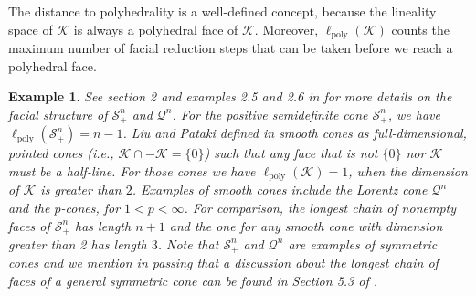 \documentclass{article}
\newcommand{\SOC}[1]{{\mathcal{Q}^{#1}}}
\newcommand{\PSDcone}[1]{{\mathcal{S}^{#1}_+}}
\newcommand{\stdCone}{ {\mathcal{K}}}
\newcommand{\distP}{\ell _{\text{poly}}}
\newtheorem{example}{Example}
\begin{document}
The distance to polyhedrality is a well-defined concept, because the lineality space
of $\stdCone$ is always a polyhedral face of $\stdCone$.
Moreover, $\distP(\stdCone)$ counts the maximum number of facial reduction steps that 
can be taken before we reach a polyhedral face.
\begin{example}\label{ex:psd_lorentz}
	See section 2 and examples 2.5 and 2.6 in \cite{pataki_handbook} for more details 
	on the facial structure of $\PSDcone{n}$ and $\SOC{n}$.
	For the positive semidefinite cone $\PSDcone{n}$, we have $\distP(\PSDcone{n}) = n-1$.
	Liu and Pataki defined in \cite{LP17} \emph{smooth cones} as 
	full-dimensional, pointed cones (i.e., $\stdCone \cap -\stdCone = \{0\}$) such that any face that is not $\{0\}$ nor $\stdCone$ must be a half-line. For those cones we have $\distP(\stdCone) = 1$, when the dimension of 
	$\stdCone$ is	greater than $2$. Examples of smooth 
	cones include the Lorentz cone $\SOC{n}$ and the $p$-cones, for $1 < p < \infty$. For comparison, 
	the longest chain of nonempty faces of $\PSDcone{n}$ has length $n+1$ and 
	the one for any smooth 
	cone with dimension greater than 2 has length $3$. Note that  $\PSDcone{n}$ and $\SOC{n}$ are examples 
	of \emph{symmetric cones} and we mention in passing that a discussion about the longest chain of faces of a general symmetric cone can be found in Section 5.3 of \cite{IL16}.
	
\end{example}
\end{document}
